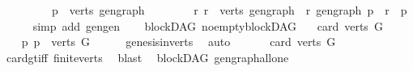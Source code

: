 \begin{isabellebody}
\ \ \isamarkupfalse%
\isanewline
\ \ \isamarkupfalse%
\ \isamarkupfalse%
\ {\isachardoublequoteopen}\ {\isasymexists}p\ {\isasymin}\ verts\ gen{\isacharunderscore}{\kern0pt}graph{\isachardot}{\kern0pt}\isanewline
\ \ \ \ \ \ \ \ {\isacharparenleft}{\kern0pt}{\isasymforall}r{\isachardot}{\kern0pt}\ r\ {\isasymin}\ verts\ gen{\isacharunderscore}{\kern0pt}graph\ {\isasymlongrightarrow}\ r\ {\isasymrightarrow}\isactrlsup {\isacharplus}{\kern0pt}\isactrlbsub gen{\isacharunderscore}{\kern0pt}graph\isactrlesub \ p\ {\isasymor}\ r\ {\isacharequal}{\kern0pt}\ p{\isacharparenright}{\kern0pt}{\isachardoublequoteclose}\isanewline
\ \ \ \ \isamarkupfalse%
\ {\isacharparenleft}{\kern0pt}simp\ add{\isacharcolon}{\kern0pt}\ gen{\isacharunderscore}{\kern0pt}gen{\isacharparenright}{\kern0pt}\isanewline
{}\isamarkupfalse%
%
\endisatagproof
{\isafoldproof}%
%
\isadelimproof
\ \isanewline
%
\endisadelimproof
\isanewline
{}\isamarkupfalse%
\ {\isacharparenleft}{\kern0pt}\ blockDAG{\isacharparenright}{\kern0pt}\ no{\isacharunderscore}{\kern0pt}empty{\isacharunderscore}{\kern0pt}blockDAG{\isacharcolon}{\kern0pt}\isanewline
\ \ \ {\isachardoublequoteopen}card\ {\isacharparenleft}{\kern0pt}verts\ G{\isacharparenright}{\kern0pt}\ {\isachargreater}{\kern0pt}\ {}{\isachardoublequoteclose}\isanewline
%
\isadelimproof
%
\endisadelimproof
%
\isatagproof
{}\isamarkupfalse%
\ {\isacharminus}{\kern0pt}\isanewline
\ \ \isamarkupfalse%
\ {\isachardoublequoteopen}{\isasymexists}p{\isachardot}{\kern0pt}\ p\ {\isasymin}\ verts\ G{\isachardoublequoteclose}\isanewline
\ \ \ \ \isamarkupfalse%
\ genesis{\isacharunderscore}{\kern0pt}in{\isacharunderscore}{\kern0pt}verts\ \isamarkupfalse%
\ auto\ \isanewline
\ \ \isamarkupfalse%
\ \isamarkupfalse%
\ {\isachardoublequoteopen}card\ {\isacharparenleft}{\kern0pt}verts\ G{\isacharparenright}{\kern0pt}\ {\isachargreater}{\kern0pt}\ {}{\isachardoublequoteclose}\isanewline
\ \ \ \ \isamarkupfalse%
\ card{\isacharunderscore}{\kern0pt}gt{\isacharunderscore}{\kern0pt}{}{\isacharunderscore}{\kern0pt}iff\ finite{\isacharunderscore}{\kern0pt}verts\ \isamarkupfalse%
\ blast\isanewline
{}\isamarkupfalse%
%
\endisatagproof
{\isafoldproof}%
%
\isadelimproof
\isanewline
%
\endisadelimproof
\isanewline
{}\isamarkupfalse%
\ {\isacharparenleft}{\kern0pt}\ blockDAG{\isacharparenright}{\kern0pt}\ gen{\isacharunderscore}{\kern0pt}graph{\isacharunderscore}{\kern0pt}all{\isacharunderscore}{\kern0pt}one{\isacharcolon}{\kern0pt}\isanewline

\end{isabellebody}

